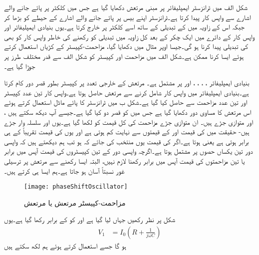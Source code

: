 شکل  الف میں ٹرانزسٹر ایمپلیفائر پر مبنی مرتعش دکھایا گیا ہے جس میں کلکٹر پر پائے جانے والے اشارے  سے واپس کار   پیدا کرتا ہے۔ٹرانزسٹر اپنے  بیس پر پائے جانے والے اشارے کے حیطے کو بڑھا کر جبکہ اس کے زاویہ میں   کے تبدیلی کے ساتھ اسے کلکٹر پر خارج کرتا ہے۔یوں بنیادی ایمپلیفائر اور واپس کار کے دائرے میں ایک چکر کے بعد کل زاویہ میں تبدیلی کو  رکھنے کی خاطر واپس کار کو بھی  کی تبدیلی پیدا کرنا ہو گی۔جیسا اوپر مثال میں دکھایا گیا، مزاحمت-کپیسٹر  کے کڑیاں استعمال کرتے ہوئے ایسا کرنا ممکن ہے۔شکل  الف میں مزاحمت اور کپیسٹر کو  شکل  الف سے قدر مختلف طرز پر جوڑا گیا ہے۔ 

بنیادی ایمپلیفائر ، ، ، ،  اور  پر مشتمل ہے۔ مرتعش کے خارجی تعدد پر کپیسٹر  بطور قصر دور کام کرتا ہے۔بنیادی ایمپلیفائر میں واپس کار شامل کرنے سے مرتعش حاصل ہوتا ہے۔واپس کار تین عدد کپیسٹر اور تین عدد مزاحمت سے حاصل کیا گیا ہے۔شکل  ب میں ٹرانزسٹر کا پائے  ماڈل استعمال کرتے ہوئے اس مرتعش کا مساوی دور دکھایا گیا ہے جس میں  کو قصر دو کیا گیا ہے۔جیسے آپ دیکھ سکتے ہیں ،  اور  متوازی جڑے ہیں۔ ان متوازی جڑے مزاحمت کی کل قیمت کو  لکھا گیا ہے۔یوں  اور  سلسلہ وار جڑے ہیں- حقیقت میں  کی قیمت  اور  کے قیمتوں سے نہایت کم ہوتی ہے اور یوں  کی قیمت تقریباً  کے ہی برابر ہوتی ہے یعنی  ہوتا ہے۔اگر  کی قیمت یوں منتخب کی جائے کہ  ہو تب ہم دیکھتے ہیں کہ واپسی دور تین یکساں   حصوں پر مشتمل ہوتا ہے۔اگرچہ واپسی دور کے تین کپیسٹروں کی قیمت آپس میں برابر یا تین مزاحمتوں کی قیمت آپس میں برابر رکھنا لازم نہیں، البتہ ایسا رکھنے سے مرتعش پر ترسیلی غور نسبتاً آسان ہو جاتا ہے۔ہم ایسا ہی کرتے ہیں۔
\begin{figure}
\centering
\texttt{[image: phaseShiftOscillator]}
\caption{مزاحمت-کپیسٹر مرتعش یا  مرتعش}
\label{شکل_مزاحمت_کپیسٹر_مرتعش}
\end{figure}
شکل  پر نظر رکھیں جہاں  لیا گیا ہے اور  کو  کے برابر رکھا گیا ہے۔یوں
\begin{align*}
V_1 &=I_0 \left(R+\frac{1}{j \omega C} \right)
\end{align*}
ہو گا جسے استعمال کرتے ہوئے ہم لکھ سکتے ہیں
